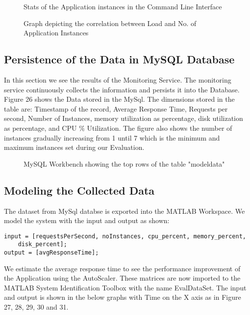 \documentclass[article,type=msc,colorback,12pt,accentcolor=tud7b,table]{tudthesis}
\begin{document}
	  \begin{figure}[h]
	  	\begin{center}
	  		\makebox[\textwidth]{\texttt{[image: E4]}}
	  	\end{center}
	  	\caption{Stats of the Application instances in the Command Line Interface}
	  \end{figure}
	  
	  	  \begin{figure}[h]
	  	  	\begin{center}
	  	  		\makebox[\textwidth]{\texttt{[image: E5]}}
	  	  	\end{center}
	  	  	\caption{Graph depicting the correlation between Load and No. of Application Instances}
	  	  \end{figure}
	
	\subsection{Persistence of the Data in MySQL Database}
	In this section we see the results of the Monitoring Service. The monitoring service continuously collects the information and persists it into the Database.  Figure 26 shows the Data stored in the MySql. The dimensions stored in the table are: Timestamp of the record, Average Response Time, Requests per second, Number of Instances, memory utilization as percentage, disk utilization as percentage, and CPU \% Utilization. The figure also shows the number of instances gradually increasing from 1 until 7 which is the minimum and maximum instances set during our Evaluation.
	
		  	  \begin{figure}[h]
		  	  	\begin{center}
		  	  		\makebox[\textwidth]{\texttt{[image: E6]}}
		  	  	\end{center}
		  	  	\caption{MySQL Workbench showing the top rows of the table "modeldata"}
		  	  \end{figure}
	
	\subsection{Modeling the Collected Data}
	
	The dataset from MySql databse is exported into the MATLAB Workspace. We model the system with the input and output as shown:
\begin{lstlisting} 
input = [requestsPerSecond, noInstances, cpu_percent, memory_percent, 
	disk_percent];
output = [avgResponseTime];
\end{lstlisting}
 We estimate the average response time to see the performance improvement of the Application using the AutoScaler. These matrices are now imported to the MATLAB System Identification Toolbox with the name EvalDataSet. The input and output is shown in the below graphs with Time on the X axis as in Figure 27, 28, 29, 30 and 31.
	
\end{document}
